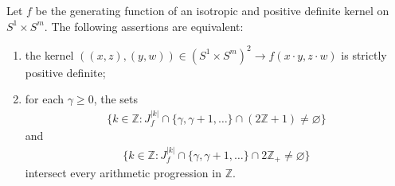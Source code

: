 \begin{Theorem}
Let $f$ be the generating function of an isotropic and positive definite kernel on~\mbox{$S^1 \times S^m$}. The following assertions are equivalent:
\begin{enumerate}\itemsep=0pt
\item[$(i)$] the kernel $((x,z), (y,w)) \in (S^1 \times S^m)^2 \to f(x \cdot y, z \cdot w)$ is strictly positive definite;
\item[$(ii)$] for each $\gamma \geq 0$, the sets
\begin{gather*}\big\{k\in \mathbb{Z}\colon J_f^{|k|} \cap \{\gamma,\gamma+1,\ldots\}\cap (2\mathbb{Z}+1)\neq \varnothing\big\}\end{gather*}
and
\begin{gather*}\big\{k\in \mathbb{Z}\colon J_f^{|k|} \cap \{\gamma,\gamma+1,\ldots\}\cap 2\mathbb{Z}_+\neq \varnothing\big\} \end{gather*}
intersect every arithmetic progression in $\mathbb{Z}$.
\end{enumerate}
\end{Theorem}
